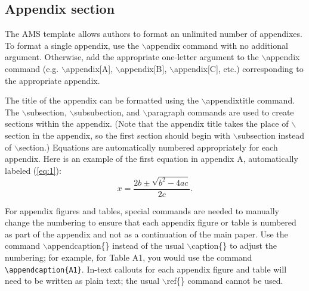 \documentclass{ametsocV5}
\begin{document}


 \appendix[A] 



\subsection*{Appendix section}

The AMS template allows authors to format an unlimited number of
appendixes. To format a single appendix, use the $\backslash$appendix
command with no additional argument. Otherwise, add the appropriate
one-letter argument to the $\backslash$appendix command (e.g.
$\backslash$appendix[A], $\backslash$appendix[B],
$\backslash$appendix[C], etc.) corresponding to the appropriate
appendix. 


The title of the appendix can be formatted using the
$\backslash$appendixtitle{\tt\string{\string}} 
 command. The $\backslash$subsection, $\backslash$subsubection,
and $\backslash$paragraph commands are used to create sections within
the appendix. (Note that the appendix title takes the place of $\backslash$section 
in the appendix, so the first section should begin with $\backslash$subsection
instead of $\backslash$section.)
 Equations are automatically numbered appropriately for 
each appendix. Here is an example of the first equation in appendix
A, automatically labeled (\ref{eq:1}): 
\begin{equation} \label{eq:1}
x=\frac{2b\pm\sqrt{b^{2}-4ac}}{2c}.  
\end{equation}

For appendix figures and tables, special commands are needed to manually 
change the numbering to ensure that each appendix figure or table is numbered 
as part of the appendix and not as a continuation of the main paper. Use the command
$\backslash$appendcaption\{\} instead of the usual $\backslash$caption\{\} to adjust the 
numbering; for example, for Table A1, you would use the command \verb+\appendcaption{A1}+.
In-text callouts for each appendix figure and table will need to be written as plain text;
the usual $\backslash$ref\{\} command cannot be used.

%
%
%
\end{document}
